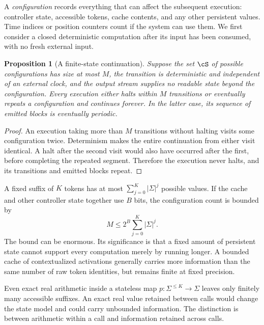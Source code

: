 \documentclass[11pt,twoside]{article}
\newtheorem{proposition}[theorem]{Proposition}
\theoremstyle{definition}
\theoremstyle{remark}
\begin{document}
A \emph{configuration} records everything that can affect the subsequent
execution: controller state, accessible tokens, cache contents, and any
other persistent values. Time indices or position counters count if the
system can use them. We first consider a closed deterministic computation
after its input has been consumed, with no fresh external input.

\begin{proposition}[A finite-state continuation]
\label{prop:finite-state}
Suppose the set $\cS$ of possible configurations has size at most $M$,
the transition is deterministic and independent of an external clock, and
the output stream supplies no readable state beyond the configuration.
Every execution either halts within $M$
transitions or eventually repeats a configuration and continues forever.
In the latter case, its sequence of emitted blocks is eventually periodic.
\end{proposition}
\begin{proof}
An execution taking more than $M$ transitions without halting visits some
configuration twice. Determinism makes the entire continuation from either
visit identical. A halt after the second visit would also have occurred
after the first, before completing the repeated segment. Therefore the
execution never halts, and its transitions and emitted blocks repeat.
\end{proof}

A fixed suffix of $K$ tokens has at most
$\sum_{j=0}^K|\Sigma|^j$ possible values. If the cache and other controller
state together use $B$ bits, the configuration count is bounded by
\begin{equation}
 M\leq 2^B\sum_{j=0}^K|\Sigma|^j.
 \label{eq:window-states}
\end{equation}
The bound can be enormous. Its significance is that a fixed amount of
persistent state cannot support every computation merely by running longer.
A bounded cache of contextualized activations generally carries more
information than the same number of raw token identities, but remains finite
at fixed precision.

Even exact real arithmetic inside a stateless map
$p:\Sigma^{\leq K}\to\Sigma$ leaves only finitely many
accessible suffixes. An exact real value retained between calls would change
the state model and could carry unbounded information. The distinction is
between arithmetic within a call and information retained across calls.
\end{document}
